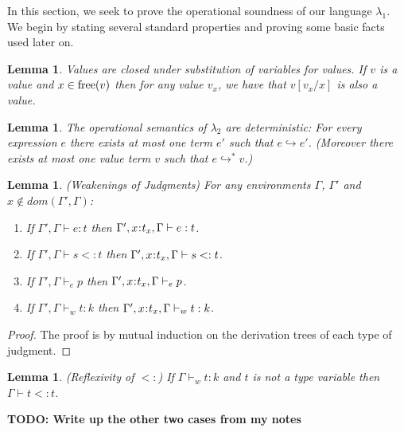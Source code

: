 \documentclass[11pt]{article}
\newtheorem{lemma}[theorem]{Lemma}
\newcommand{\bind}{\hspace{0.05em}{:}\hspace{0.05em}} %
\newcommand{\step}{\hookrightarrow}
\newcommand{\many}{\hookrightarrow^*}
\begin{document}
In this section, we seek to prove the operational soundness of our language $\lambda_1$. We begin by stating several standard properties and proving some basic facts used later on.

\begin{lemma}\label{value-sub}
Values are closed under substitution of variables for values. If $v$ is a value and $x \in {\rm free}(v)$ then for any value $v_x$, we have that $v[v_x/x]$ is also a value.
\end{lemma}

\begin{lemma}\label{step-determ}
The operational semantics of $\lambda_2$ are deterministic: For every expression $e$ there exists at most one term $e'$ such that $e \step e'$. (Moreover there exists at most one value term $v$ such that $e \many v$.)
\end{lemma}

\begin{lemma}\label{weakenings}
(Weakenings of Judgments) For any environments $\Gamma$, $\Gamma'$ and $x \not\in dom(\Gamma', \Gamma)$:
\begin{enumerate}
\item If $\Gamma', \Gamma \vdash e : t$ then $\Gamma', x\bind t_x, \Gamma \vdash e :  t$.
\item If $\Gamma', \Gamma \vdash s <: t$ then $\Gamma', x\bind t_x, \Gamma \vdash s <: t$.
\item If $\Gamma', \Gamma \vdash_e p$ then $\Gamma', x\bind t_x, \Gamma \vdash_e p$.
\item If $\Gamma', \Gamma \vdash_w t:k$ then $\Gamma', x\bind t_x, \Gamma \vdash_w t:k$.
\end{enumerate}
\end{lemma}
\begin{proof}
The proof is by mutual induction on the derivation trees of each type of judgment.
%
%
%
\end{proof}


\begin{lemma}\label{sub-refl}
(Reflexivity of $<:$) If $\Gamma \vdash_w t : k$ and $t$ is not a type variable then $\Gamma \vdash t <: t$.
\end{lemma} {\bf TODO: Write up the other two cases from my notes}
\end{document}

